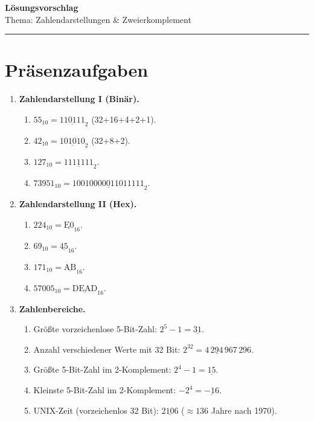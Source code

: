 \documentclass[11pt,a4paper]{scrartcl}
\newcommand{\sheettitle}[2]{%
	{\Large\bfseries #1}\\[-0.2em]
	{\normalsize #2}\par\hrule\vspace{1.0em}
}
\begin{document}
	
	\sheettitle{Lösungsvorschlag}{Thema: Zahlendarstellungen \& Zweierkomplement}
	
	\section*{Präsenzaufgaben}
	
	\begin{enumerate}[leftmargin=*,label=\textbf{Aufgabe~\arabic*:}, itemsep=0.9em]
		
		\item \textbf{Zahlendarstellung I (Binär).}
		\begin{enumerate}[label*=\alph*)]
			\item \(55_{10} = \underline{110111}_2\) \quad (32+16+4+2+1).  %
			\item \(42_{10} = \underline{101010}_2\) \quad (32+8+2).       %
			\item \(127_{10} = \underline{1111111}_2\).                    %
			\item \(73951_{10} = \underline{10010000011011111}_2\).        %
		\end{enumerate}
		
		\item \textbf{Zahlendarstellung II (Hex).}
		\begin{enumerate}[label*=\alph*)]
			\item \(224_{10} = \underline{\mathrm{E0}}_{16}\).
			\item \(69_{10}  = \underline{\mathrm{45}}_{16}\).
			\item \(171_{10} = \underline{\mathrm{AB}}_{16}\).
			\item \(57005_{10} = \underline{\mathrm{DEAD}}_{16}\).
		\end{enumerate}
		
		\item \textbf{Zahlenbereiche.}
		\begin{enumerate}[label*=\alph*)]
			\item Größte vorzeichenlose 5-Bit-Zahl: \(2^5-1=\underline{31}\).
			\item Anzahl verschiedener Werte mit 32 Bit: \(\underline{2^{32}=4\,294\,967\,296}\).
			\item Größte 5-Bit-Zahl im 2-Komplement: \(2^{4}-1=\underline{15}\).
			\item Kleinste 5-Bit-Zahl im 2-Komplement: \(-2^{4}=\underline{-16}\).
			\item UNIX-Zeit (vorzeichenlos 32 Bit): \(\underline{2106}\) (\(\approx 136\) Jahre nach 1970).
		\end{enumerate}
		

\end{enumerate}
\end{document}
